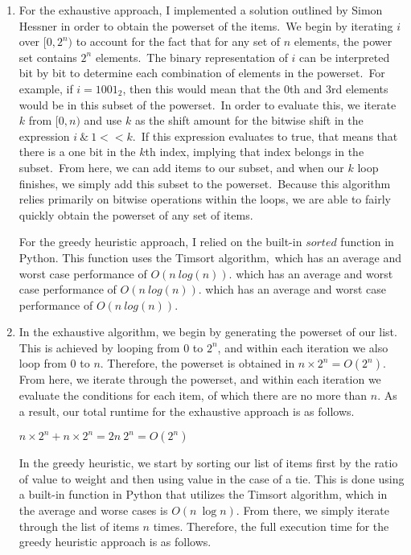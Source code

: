 \documentclass[12pt]{article}
\begin{document}
\begin{enumerate}
    \item For the exhaustive approach, I implemented a solution outlined by Simon Hessner in order to obtain the powerset of the items.\
          We begin by iterating $i$ over $[0, 2^n)$ to account for the fact that for any set of $n$ elements, the power set contains $2^n$ elements.\
          The binary representation of $i$ can be interpreted bit by bit to determine each combination of elements in the powerset.\
          For example, if $i = 1001_2$, then this would mean that the 0th and 3rd elements would be in this subset of the powerset.\
          In order to evaluate this, we iterate $k$ from $[0, n)$ and use $k$ as the shift amount for the bitwise shift in the expression $i\ \&\ 1<<k$.\
          If this expression evaluates to true, that means that there is a one bit in the $k$th index, implying that index belongs in the subset.\
          From here, we can add items to our subset, and when our $k$ loop finishes, we simply add this subset to the powerset.\
          Because this algorithm relies primarily on bitwise operations within the loops, we are able to fairly quickly obtain the powerset of any set of items.

          For the greedy heuristic approach, I relied on the built-in $sorted$ function in Python. This function uses the Timsort algorithm,\
          which has an average and worst case performance of $O(n\ log(n))$.
which has an average and worst case performance of $O(n\ log(n))$. 
          which has an average and worst case performance of $O(n\ log(n))$.

    \item In the exhaustive algorithm, we begin by generating the powerset of our list.
    This is achieved by looping from $0$ to $2^n$, and within each iteration we also loop from 0 to $n$.
    Therefore, the powerset is obtained in $n \times 2^n = O(2^n)$. From here, we iterate through the powerset,
    and within each iteration we evaluate the conditions for each item, of which there are no more than $n$.
    As a result, our total runtime for the exhaustive approach is as follows.
    
    \begin{center}
        $n \times 2^n + n \times 2^n = 2n\ 2^n = O(2^n)$
    \end{center}

    In the greedy heuristic, we start by sorting our list of items
    first by the ratio of value to weight and then using value in the case of a tie.
    This is done using a built-in function in Python that utilizes the Timsort algorithm,
    which in the average and worse cases is $O(n\ \log n)$. From there, we simply iterate
    through the list of items $n$ times. Therefore, the full execution time for the greedy
    heuristic approach is as follows. 
    

\end{enumerate}
\end{document}
